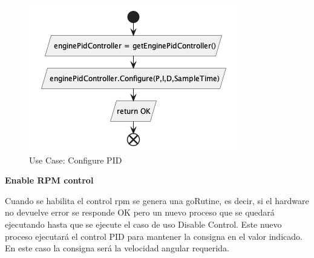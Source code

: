 \begin{figure}[H]
    \centering
    \includegraphics[height=0.2\textheight]{./part/Proyecto_ejecutivo/memoria_descriptiva/descripcionDelProyecto/control/uml/configurePID}
    \caption{Use Case: Configure PID}\label{fig:Use Case-Configure PID}
\end{figure}

\newpage
\textbf{Enable RPM control}

Cuando se habilita el control rpm se genera una goRutine, es decir, si el hardware no devuelve error se responde OK pero un nuevo proceso que se quedará ejecutando hasta que se ejecute el caso de uso Disable Control. Este nuevo proceso ejecutará el control PID para mantener la consigna en el valor indicado. En este caso la consigna será la velocidad angular requerida.

